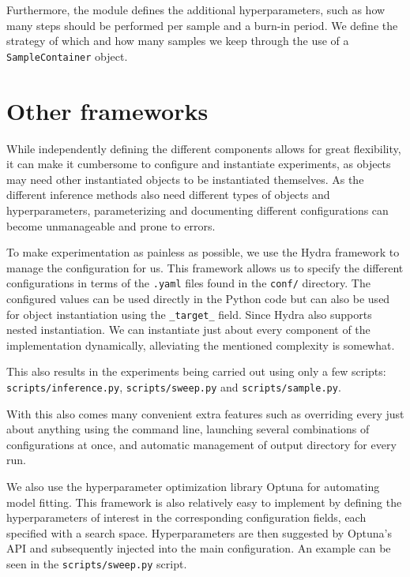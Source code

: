 Furthermore, the module defines the additional hyperparameters, such as how many steps should be performed per sample and a burn-in period.
We define the strategy of which and how many samples we keep through the use of a \texttt{SampleContainer} object.

\section{Other frameworks}

While independently defining the different components allows for great flexibility, it can make it cumbersome to configure and instantiate experiments, as objects may need other instantiated objects to be instantiated themselves.
As the different inference methods also need different types of objects and hyperparameters, parameterizing and documenting different configurations can become unmanageable and prone to errors.

To make experimentation as painless as possible, we use the Hydra \cite{yadan_hydra_2019} framework to manage the configuration for us.  
This framework allows us to specify the different configurations in terms of the \texttt{.yaml} files found in the \texttt{conf/} directory.
The configured values can be used directly in the Python code but can also be used for object instantiation using the \texttt{\_target\_} field.
Since Hydra also supports nested instantiation.
We can instantiate just about every component of the implementation dynamically, alleviating the mentioned complexity is somewhat.

This also results in the experiments being carried out using only a few scripts: \texttt{scripts/inference.py}, \texttt{scripts/sweep.py} and \texttt{scripts/sample.py}.

With this also comes many convenient extra features such as overriding every just about anything using the command line, launching several combinations of configurations at once, and automatic management of output directory for every run.

We also use the hyperparameter optimization library Optuna \cite{akiba_optuna_2019} for automating model fitting.
This framework is also relatively easy to implement by defining the hyperparameters of interest in the corresponding configuration fields, each specified with a search space. 
Hyperparameters are then suggested by Optuna's API and subsequently injected into the main configuration. 
An example can be seen in the \texttt{scripts/sweep.py} script.
